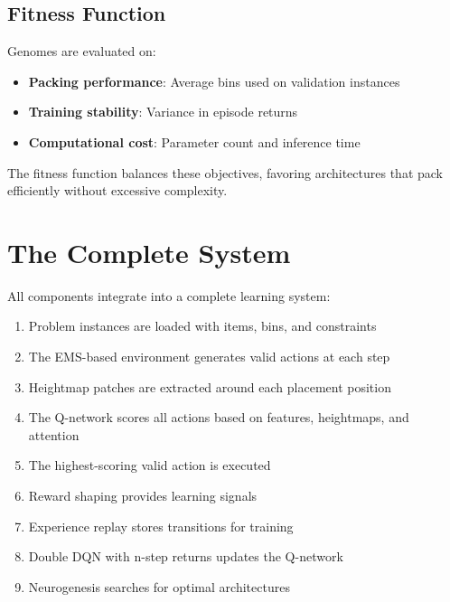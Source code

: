 \subsection{Fitness Function}

Genomes are evaluated on:
\begin{itemize}
    \item \textbf{Packing performance}: Average bins used on validation instances
    \item \textbf{Training stability}: Variance in episode returns
    \item \textbf{Computational cost}: Parameter count and inference time
\end{itemize}

The fitness function balances these objectives, favoring architectures that pack efficiently without excessive complexity.

\section{The Complete System}

All components integrate into a complete learning system:

\begin{enumerate}
    \item Problem instances are loaded with items, bins, and constraints
    \item The EMS-based environment generates valid actions at each step
    \item Heightmap patches are extracted around each placement position
    \item The Q-network scores all actions based on features, heightmaps, and attention
    \item The highest-scoring valid action is executed
    \item Reward shaping provides learning signals
    \item Experience replay stores transitions for training
    \item Double DQN with n-step returns updates the Q-network
    \item Neurogenesis searches for optimal architectures
\end{enumerate}


